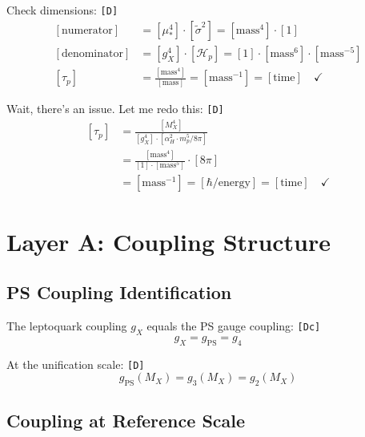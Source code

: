 \documentclass[11pt,a4paper]{article}
\newcommand{\tagD}{\textcolor{green!50!black}{\texttt{[D]}}}
\newcommand{\tagDc}{\textcolor{blue!70!black}{\texttt{[Dc]}}}
\theoremstyle{definition}
\begin{document}
Check dimensions: \tagD{}
\begin{align}
\label{eq:dim-check-num}
[\text{numerator}] &= [\mu_*^4] \cdot [\tilde{\sigma}^2] = [\text{mass}^4] \cdot [1] \\
\label{eq:dim-check-den}
[\text{denominator}] &= [g_X^4] \cdot [\mathcal{H}_p] = [1] \cdot [\text{mass}^6] \cdot [\text{mass}^{-5}] \\
\label{eq:dim-check-result}
[\tau_p] &= \frac{[\text{mass}^4]}{[\text{mass}]} = [\text{mass}^{-1}] = [\text{time}] \quad \checkmark
\end{align}

Wait, there's an issue. Let me redo this: \tagD{}
\begin{align}
\label{eq:dim-redo-1}
[\tau_p] &= \frac{[M_X^4]}{[g_X^4] \cdot [\alpha_H^2 \cdot m_p^5 / 8\pi]} \\
\label{eq:dim-redo-2}
&= \frac{[\text{mass}^4]}{[1] \cdot [\text{mass}^5]} \cdot [8\pi] \\
\label{eq:dim-redo-3}
&= [\text{mass}^{-1}] = [\hbar / \text{energy}] = [\text{time}] \quad \checkmark
\end{align}

\section{Layer A: Coupling Structure}
\label{sec:coupling-structure}

\subsection{PS Coupling Identification}
\label{subsec:ps-coupling}

The leptoquark coupling $g_X$ equals the PS gauge coupling: \tagDc{}
\begin{equation}
\label{eq:gx-gps}
g_X = g_{\text{PS}} = g_4
\end{equation}

At the unification scale: \tagD{}
\begin{equation}
\label{eq:gps-unification}
g_{\text{PS}}(M_X) = g_3(M_X) = g_2(M_X)
\end{equation}

\subsection{Coupling at Reference Scale}
\label{subsec:coupling-mustar}
\end{document}
